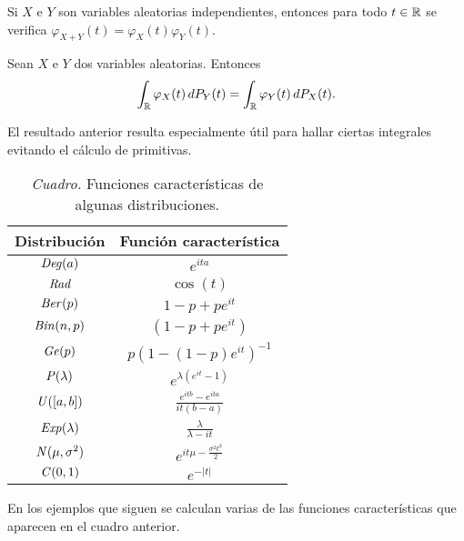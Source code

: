 \documentclass[a4paper, 11pt, extrafontsizes]{memoir}
\begin{document}
\begin{proposition}
    Si $X$ e $Y$ son variables aleatorias independientes, entonces para todo $t \in \mathbb R$ se verifica $\varphi_{X+Y}(t) = \varphi_X(t)\varphi_Y(t)$.
\end{proposition}

\begin{proposition}
    Sean $X$ e $Y$ dos variables aleatorias. Entonces
    \[\int_\mathbb R \varphi_X(t) \, dP_Y(t) = \int_\mathbb R \varphi_Y(t) \, dP_X(t).\]
\end{proposition}

El resultado anterior resulta especialmente útil para hallar ciertas integrales evitando el cálculo de primitivas.

\pagebreak

\begin{table}[!ht]
    \centering
    \setlength\extrarowheight{6.5pt}
    \begin{tabular}{|c|c|}
        \hline
        \textbf{Distribución} & \textbf{Función característica} \\[6pt] \hline
        $\textup{\emph{Deg}}(a)$ & $e^{ita}$ \\[6pt] \hline
        $\textup{\emph{Rad}}$ & $\cos(t)$ \\[6pt] \hline
        $\textup{\emph{Ber}}(p)$ & $1-p+pe^{it}$ \\[6pt] \hline
        $\textup{\emph{Bin}}(n,p)$ & $(1-p+pe^{it})$ \\[6pt] \hline
        $\textup{\emph{Ge}}(p)$ & $p(1-(1-p)e^{it})^{-1}$ \\[6pt] \hline
        $\textup{\emph{P}}(\lambda)$ & $e^{\lambda(e^{it}-1)}$ \\[6pt] \hline
        $\textup{\emph{U}}([a,b])$ & $\frac{e^{itb}-e^{ita}}{it(b-a)}$ \\[6pt] \hline
        $\textup{\emph{Exp}}(\lambda)$ & $\frac{\lambda}{\lambda-it}$ \\[6pt] \hline
        $\textup{\emph{N}}(\mu,\sigma^2)$ & $e^{it\mu-\frac{\sigma^2t^2}{2}}$ \\[6pt] \hline
        $\textup{\emph{C}}(0,1)$ & $e^{-|t|}$ \\[6pt] \hline
    \end{tabular}
    \caption*{\emph{Cuadro.} Funciones características de algunas distribuciones.}
\end{table}

En los ejemplos que siguen se calculan varias de las funciones características que aparecen en el cuadro anterior.
\end{document}
